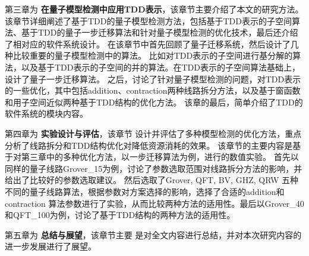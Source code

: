 第三章为 \textbf{在量子模型检测中应用TDD表示}，该章节主要介绍了本文的研究方法。
该章节详细阐述了基于TDD的量子模型检测方法，包括基于TDD表示的子空间算法、基于TDD的量子一步迁移算法和针对量子模型检测的优化技术，最后还介绍了相对应的软件系统设计。
在该章节中首先回顾了量子迁移系统，然后设计了几种比较重要的量子模型检测中的算法。
比如对TDD表示的子空间进行基分解的算法，以及基于TDD表示的子空间的并的算法。在TDD表示的子空间算法基础上，设计了量子一步迁移算法。
之后，讨论了针对量子模型检测的问题，对TDD表示的一些优化，其中包括addition、contraction两种线路拆分方法，以及基于窗函数和用子空间近似两种基于TDD结构的优化方法。
该章的最后，简单介绍了TDD的软件系统的模块内容。

第四章为 \textbf{实验设计与评估}，该章节
设计并评估了多种模型检测的优化方法，重点分析了线路拆分和TDD结构优化对降低资源消耗的效果。
该章节的主要内容是基于对第三章中的多种优化方法，以一步迁移算法为例，进行的数值实验。
首先以同样的量子线路Grover\_15为例，讨论了参数选取范围对线路拆分方法的影响，并给出了比较好的参数选取建议。
然后选取了Grover, QFT, BV, GHZ, QRW
五种不同的量子线路算法，根据参数对方案选择的影响，选择了合适的addition和contraction
算法参数进行了实验，从而比较两种方法的适用性。最后以Grover\_40和QFT\_100为例，讨论了基于TDD结构的两种方法的适用性。

第五章为 \textbf{总结与展望}，该章节主要
是对全文内容进行总结，并对本次研究内容的进一步发展进行了展望。